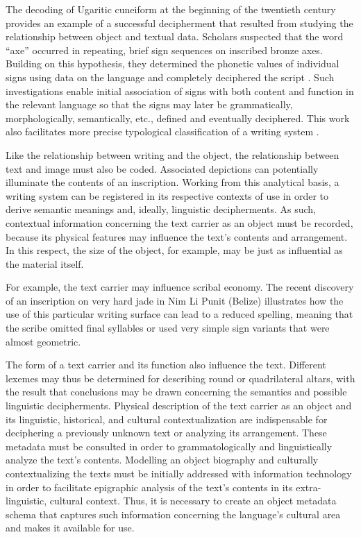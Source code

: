 \documentclass[amsthm,ebook]{saparticle}
\begin{document}
The decoding of Ugaritic cuneiform at the beginning of the twentieth century provides an example of a successful
decipherment that resulted from studying the relationship between object and textual data. Scholars suspected that the
word ``axe'' occurred in repeating, brief sign sequences on inscribed bronze axes. Building on this hypothesis, they
determined the phonetic values of individual signs using data on the %
language and completely deciphered the script \citep{Day2002}. Such investigations enable initial association of signs with both content and function in the
relevant language so that the signs may later be grammatically, morphologically, semantically, etc., defined and
eventually deciphered. This work also facilitates more precise typological classification of a writing system
\citep{Gronemeyer2015}.

Like the relationship between writing and the object, the relationship between text and image must also be coded.
Associated depictions can potentially illuminate the contents of an inscription. Working from this analytical basis, a
writing system can be registered in its respective contexts of use in order to derive semantic meanings and, ideally,
linguistic decipherments. As such, contextual information concerning the text carrier as an object must be recorded,
because its physical features may influence the text’s contents and arrangement. In this respect, the size of the
object, for example, may be just as influential as the material itself.

For example, the text carrier may influence scribal economy. The recent discovery of an inscription on very hard jade in
Nim Li Punit (Belize) illustrates how the use of this particular writing surface can lead to a reduced spelling,
meaning that the scribe omitted final syllables or used very simple sign variants that were almost geometric. 

The form of a text carrier and its function also influence the text. Different lexemes may thus be determined for
describing round or quadrilateral altars, with the result that conclusions may be drawn concerning the semantics and
possible linguistic decipherments. Physical description of the text carrier as an object and its linguistic,
historical, and cultural contextualization are indispensable for deciphering a previously unknown text or analyzing its
arrangement. These metadata must be consulted in order to grammatologically and linguistically analyze the text’s
contents. 
\newpage
Modelling an object biography and culturally contextualizing the texts must be initially addressed with information
technology in order to facilitate epigraphic analysis of the text’s contents in its extra-linguistic, cultural context.
Thus, it is necessary to create an object metadata schema that captures such information concerning the language’s
cultural area and makes it available for use. 
\end{document}
